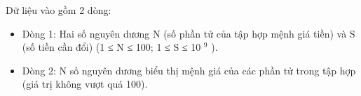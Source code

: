 Dữ liệu vào gồm 2 dòng:  
\begin{itemize}
	\item     Dòng 1: Hai số nguyên dương N (số phần tử của tập hợp mệnh giá tiền) và S (số tiền cần đổi) (1 ≤ N ≤ 100; 1 ≤ S ≤ 10    $^     9    $    ).   
	\item     Dòng 2: N số nguyên dương biểu thị mệnh giá của các phần tử trong tập hợp (giá trị không vượt quá 100).   
\end{itemize}

\